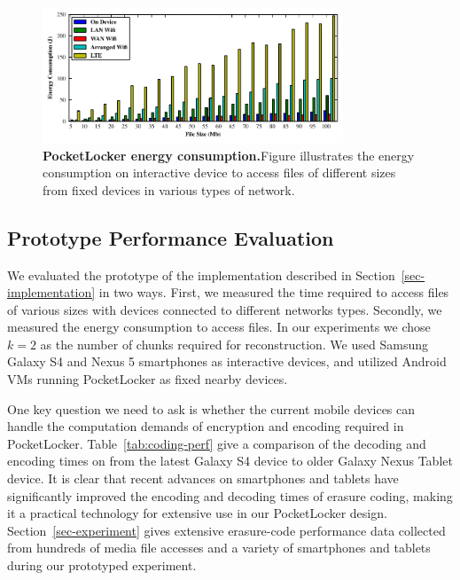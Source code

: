 \begin{figure}[t]
  \centering
  \includegraphics[width=0.8\textwidth]{./figures/energyconsumption.pdf}
  
  \vspace*{-0.1in}

  \caption{\small \textbf{PocketLocker energy consumption.}Figure illustrates the energy
  consumption on interactive device to access files of different sizes from
fixed devices in various types of network.}

  \label{fig-evaluation-energy}
  
  \vspace*{0.05in}


  \vspace*{-0.2in}

\end{figure}
\subsection{Prototype Performance Evaluation}

We evaluated the prototype of the implementation described in
Section~\ref{sec-implementation} in two ways. First, we measured the time
required to access files of various sizes with devices connected to different
networks types. Secondly, we measured the energy consumption to access files.
In our experiments we chose $k=2$ as the number of chunks required for
reconstruction. We used Samsung Galaxy S4 and Nexus 5 smartphones as
interactive devices, and utilized Android VMs running PocketLocker as fixed
nearby devices.

One key question we need to ask is whether the current mobile devices can
handle the computation demands of encryption and encoding required in
PocketLocker. Table~\ref{tab:coding-perf}
give a comparison of the decoding and encoding times on from the latest Galaxy S4
device to older Galaxy Nexus Tablet device.  It is clear that recent advances on smartphones
and tablets have significantly improved the encoding and decoding times of erasure coding, making
it a practical technology for extensive use in our PocketLocker design.
Section~\ref{sec-experiment} gives extensive erasure-code performance data collected from hundreds of media file accesses and a variety of smartphones and tablets during our prototyped experiment.

